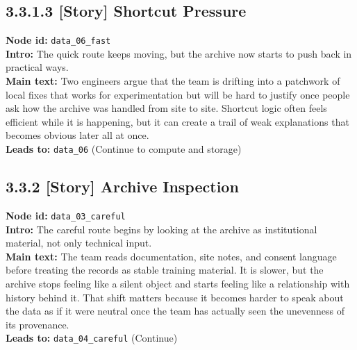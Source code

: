 \documentclass[11pt]{article}
\begin{document}
\subsection*{3.3.1.3 [Story] Shortcut Pressure}
\textbf{Node id:} \texttt{data\_06\_fast}\\
\textbf{Intro:} The quick route keeps moving, but the archive now starts to push back in practical ways.\\
\textbf{Main text:} Two engineers argue that the team is drifting into a patchwork of local fixes that works for experimentation but will be hard to justify once people ask how the archive was handled from site to site. Shortcut logic often feels efficient while it is happening, but it can create a trail of weak explanations that becomes obvious later all at once.\\
\textbf{Leads to:} \texttt{data\_06} (Continue to compute and storage)\\
\subsection*{3.3.2 [Story] Archive Inspection}
\textbf{Node id:} \texttt{data\_03\_careful}\\
\textbf{Intro:} The careful route begins by looking at the archive as institutional material, not only technical input.\\
\textbf{Main text:} The team reads documentation, site notes, and consent language before treating the records as stable training material. It is slower, but the archive stops feeling like a silent object and starts feeling like a relationship with history behind it. That shift matters because it becomes harder to speak about the data as if it were neutral once the team has actually seen the unevenness of its provenance.\\
\textbf{Leads to:} \texttt{data\_04\_careful} (Continue)\\
\end{document}
